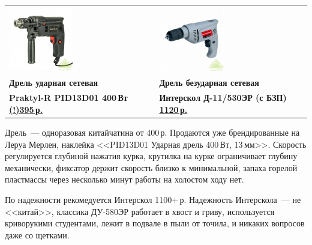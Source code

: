 \secdown

\pagebreak{}

\noindent
\begin{tabular}{p{} p{}}
\noindent
\includegraphics[width=0.45\textwidth]{tech/tools/PraktylR.jpg}
&
\noindent
\includegraphics[width=0.45\textwidth]{tech/tools/D_11_530ER.jpg}
\\
\textbf{Дрель ударная сетевая} & \textbf{Дрель безударная сетевая} \\
\textbf{Praktyl-R PID13D01 400\,Вт}
\href{http://leroymerlin.ru/catalogue/instrumenty/elektroinstrument/dreli\_udarnye/13805983/}{\textbf{(!)395\,р.}}
&
\textbf{Интерскол Д-11/530ЭР (с БЗП)}
\href{http://leroymerlin.ru/catalogue/instrumenty/elektroinstrument/dreli\_bezudarnye/11857763/}{\textbf{1120\,р.}}
\\
\end{tabular}
\bigskip

Дрель\ --- одноразовая китайчатина от 400\,р. Продаются уже брендированные на
Леруа Мерлен, наклейка <<PID13D01 Ударная дрель 400\,Вт, 13\,мм>>. Скорость
регулируется глубиной нажатия курка, крутилка на курке ограничивает глубину
механически, фиксатор держит скорость близко к минимальной, запаха горелой
пластмассы через несколько минут работы на холостом ходу нет.

По надежности рекомедуется Интерскол 1100+\,р. Надежность Интерскола\ --- не
<<китай>>, классика ДУ-580ЭР работает в хвост и гриву, используется криворукими
студентами, лежит в подвале в пыли от точила, и никаких вопросов даже со
щетками.

